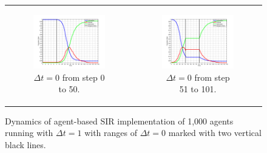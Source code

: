 \begin{figure}
\begin{center}
	\begin{tabular}{c c}
		\begin{subfigure}[b]{0.5\textwidth}
			\centering
			\includegraphics[width=.8\textwidth, angle=0]{./../shared/fig/dtzero/SIR_ABS_zeroDt_start.png}
			\caption{$\Delta t = 0$ from step 0 to 50.}
			\label{fig:sd_plot_10dt}
		\end{subfigure}
	
		& 
		
		\begin{subfigure}[b]{0.5\textwidth}
			\centering
			\includegraphics[width=.8\textwidth, angle=0]{./../shared/fig/dtzero/SIR_ABS_zeroDt_mid.png}
			\caption{$\Delta t = 0$ from step 51 to 101.}
			\label{fig:sd_plot_0.01dt}
		\end{subfigure}
	\end{tabular}
	
	\caption{Dynamics of agent-based SIR implementation of 1,000 agents running with $\Delta t = 1$ with ranges of $\Delta t = 0$ marked with two vertical black lines.}
	\label{fig:sir_abs_zero_dt}
\end{center}
\end{figure}

